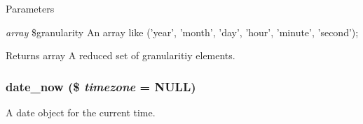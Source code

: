 \begin{DoxyParams}{Parameters}
\item[{\em array}]\$granularity An array like ('year', 'month', 'day', 'hour', 'minute', 'second');\end{DoxyParams}
\begin{DoxyReturn}{Returns}
array A reduced set of granularitiy elements. 
\end{DoxyReturn}
\hypertarget{date__api_8module_aa5e548195859cb8de5c160dda99f1877}{
\subsubsection[{date\_\-now}]{\setlength{\rightskip}{0pt plus 5cm}date\_\-now (\$ {\em timezone} = {\ttfamily NULL})}}
\label{date__api_8module_aa5e548195859cb8de5c160dda99f1877}
A date object for the current time.


